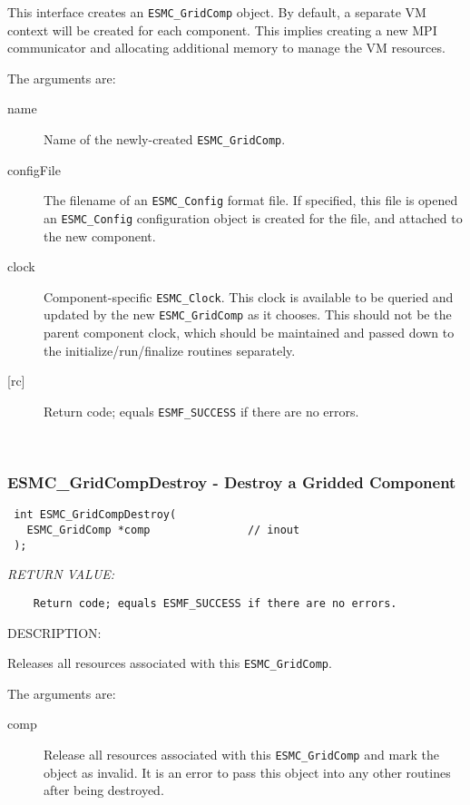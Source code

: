   
    This interface creates an {\tt ESMC\_GridComp} object. By default, a
    separate VM context will be created for each component.  This implies
    creating a new MPI communicator and allocating additional memory to
    manage the VM resources.
  
    The arguments are:
    \begin{description}
    \item[name]
      Name of the newly-created {\tt ESMC\_GridComp}.
    \item[configFile]
     The filename of an {\tt ESMC\_Config} format file. If specified, this file
     is opened an {\tt ESMC\_Config}  configuration object is created for the
     file, and attached to the new component. 
    \item[clock]
     Component-specific {\tt ESMC\_Clock}. This clock is available to be queried
     and updated by the new {\tt ESMC\_GridComp} as it chooses. This should not
     be the parent component clock, which should be maintained and passed down
     to the initialize/run/finalize routines separately. 
    \item[{[rc]}]
     Return code; equals {\tt ESMF\_SUCCESS} if there are no errors.
    \end{description}
   
 
\mbox{}\hrulefill\ 
 
\subsubsection [ESMC\_GridCompDestroy] {ESMC\_GridCompDestroy - Destroy a Gridded Component}


  
\begin{verbatim} int ESMC_GridCompDestroy(
   ESMC_GridComp *comp               // inout
 );\end{verbatim}{\em RETURN VALUE:}
\begin{verbatim}    Return code; equals ESMF_SUCCESS if there are no errors.\end{verbatim}
{\sf DESCRIPTION:\\ }


  
    Releases all resources associated with this {\tt ESMC\_GridComp}.
  
    The arguments are:
    \begin{description}
    \item[comp]
      Release all resources associated with this {\tt ESMC\_GridComp} and mark
      the object as invalid. It is an error to pass this object into any other
      routines after being destroyed. 
   \end{description}
   
